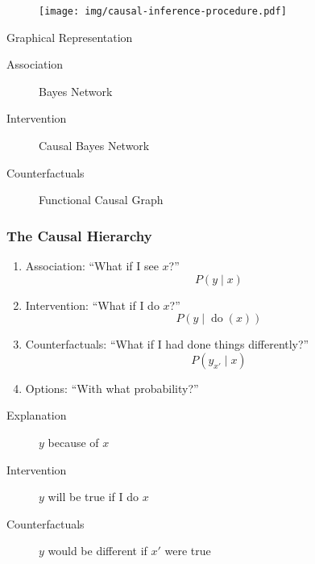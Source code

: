 \documentclass[UTF8,11pt,colorlinks,compress,openany]{beamer}%
\begin{document}
\begin{frame}\frametitle{}
\begin{figure}[H]
\texttt{[image: img/causal-inference-procedure.pdf]}	
\end{figure}
\begin{block}{Graphical Representation}
\begin{description}
	\item[Association] Bayes Network
	\item[Intervention] Causal Bayes Network
	\item[Counterfactuals] Functional Causal Graph
\end{description}
\end{block}
\end{frame}

\begin{frame}\frametitle{The Causal Hierarchy}
\begin{enumerate}
	\item Association: ``What if I see $x$?'' \[P(y\mid x)\]
	\item Intervention: ``What if I do $x$?'' \[P(y\mid \operatorname{do}(x))\]
	\item Counterfactuals: ``What if I had done things differently?'' \[P(y_{x'}\mid x)\]
	\item Options: ``With what probability?''
\end{enumerate}
\begin{description}
	\item[Explanation] $y$ because of $x$
	\item[Intervention] $y$ will be true if I do $x$
	\item[Counterfactuals] $y$ would be different if $x'$ were true
\end{description}
\end{frame}
\end{document}
